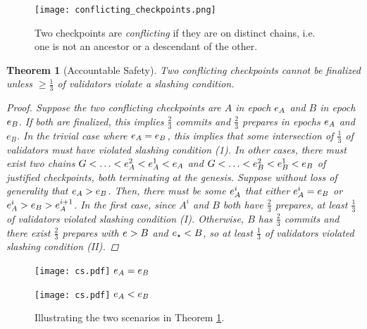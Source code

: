 \documentclass[12pt, final]{article}
\newtheorem{theorem}{Theorem}
\newcommand{\epoch}{\ensuremath{e}\space}
\newcommand{\epochsource}{\ensuremath{\epoch_{\star}}\space}
\newcommand{\Genesisblock}{\ensuremath{G}\space}
\begin{document}
\begin{figure}[h!tb]
\centering
    \texttt{[image: conflicting\_checkpoints.png]}
\caption{Two checkpoints are \textit{conflicting} if they are on distinct chains, i.e. one is not an ancestor or a descendant of the other.}
\label{fig:conflicting_checkpoints}
\end{figure}


\begin{theorem}[Accountable Safety]
\label{theorem:safety}
Two conflicting checkpoints cannot be finalized unless $\geq \frac{1}{3}$ of validators violate a slashing condition.

\begin{proof}
Suppose the two conflicting checkpoints are $A$ in epoch $\epoch_A$ and $B$ in epoch $\epoch_B$. If both are finalized, this implies $\frac{2}{3}$ commits and $\frac{2}{3}$ prepares in epochs $\epoch_A$ and $e_B$. In the trivial case where $\epoch_A = \epoch_B$, this implies that some intersection of $\frac{1}{3}$ of validators must have violated slashing condition (1). In other cases, there must exist two chains $\Genesisblock < \ldots < \epoch_A^2 < \epoch_A^1 < \epoch_A$ and $\Genesisblock < \ldots < \epoch_B^2 < \epoch_B^1 < \epoch_B$ of justified checkpoints, both terminating at the genesis. Suppose without loss of generality that $\epoch_A > \epoch_B$. Then, there must be some $\epoch_A^i$ that either $\epoch_A^i = \epoch_B$ or $\epoch_A^i > \epoch_B > \epoch_A^{i+1}$. In the first case, since $A^i$ and $B$ both have $\frac{2}{3}$ prepares, at least $\frac{1}{3}$ of validators violated slashing condition (I). Otherwise, $B$ has $\frac{2}{3}$ commits and there exist $\frac{2}{3}$ prepares with $\epoch > B$ and $\epochsource < B$, so at least $\frac{1}{3}$ of validators violated slashing condition (II).
\end{proof}
\end{theorem}

\begin{figure}[h!tb]
\centering
   \begin{minipage}[b]{0.48\textwidth}
    \texttt{[image: cs.pdf]}
    \centering
    $\epoch_A = \epoch_B$
   \end{minipage}
   \begin{minipage}[b]{0.48\textwidth}
    \texttt{[image: cs.pdf]}
    \centering
    $\epoch_A < \epoch_B$
   \end{minipage}
\label{fig:conflicting_checkpoints}
\caption{Illustrating the two scenarios in Theorem \ref{theorem:safety}.}
\end{figure}
\end{document}
